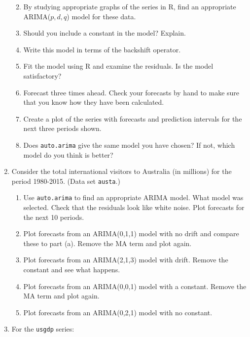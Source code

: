 \documentclass[]{book}
\providecommand{\tightlist}{%
  \setlength{\itemsep}{0pt}\setlength{\parskip}{0pt}}
\begin{document}
\begin{enumerate}
  \begin{enumerate}
  \def\labelenumii{(\alph{enumii})}
  \tightlist
  \item
    By studying appropriate graphs of the series in R, find an appropriate ARIMA(\(p,d,q\)) model for these data.
  \item
    Should you include a constant in the model? Explain.
  \item
    Write this model in terms of the backshift operator.
  \item
    Fit the model using R and examine the residuals. Is the model satisfactory?
  \item
    Forecast three times ahead. Check your forecasts by hand to make sure that you know how they have been calculated.
  \item
    Create a plot of the series with forecasts and prediction intervals for the next three periods shown.
  \item
    Does \texttt{auto.arima} give the same model you have chosen? If not, which model do you think is better?
  \end{enumerate}
\item
  Consider the total international visitors to Australia (in millions) for the period 1980-2015. (Data set \texttt{austa}.)

  \begin{enumerate}
  \def\labelenumii{\alph{enumii}.}
  \tightlist
  \item
    Use \texttt{auto.arima} to find an appropriate ARIMA model. What model was selected. Check that the residuals look like white noise. Plot forecasts for the next 10 periods.
  \item
    Plot forecasts from an ARIMA(0,1,1) model with no drift and compare these to part (a). Remove the MA term and plot again.
  \item
    Plot forecasts from an ARIMA(2,1,3) model with drift. Remove the constant and see what happens.
  \item
    Plot forecasts from an ARIMA(0,0,1) model with a constant. Remove the MA term and plot again.
  \item
    Plot forecasts from an ARIMA(0,2,1) model with no constant.
  \end{enumerate}
\item
  For the \texttt{usgdp} series:


\end{enumerate}
\end{document}
